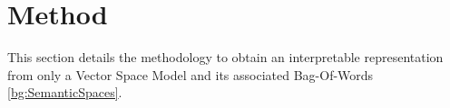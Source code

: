 

\section{Method}\label{ch3:method}

This section details the methodology to obtain an interpretable representation from only a Vector Space Model and its associated Bag-Of-Words \ref{bg:SemanticSpaces}. %





 

